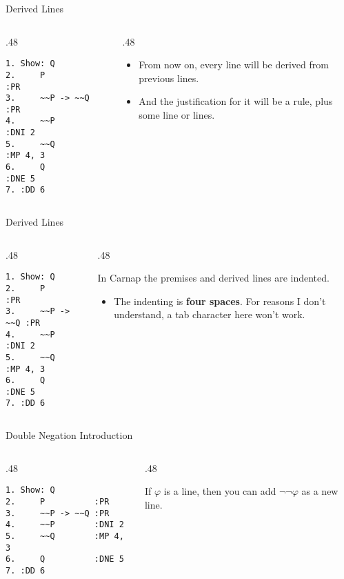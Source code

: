 \documentclass[
  ignorenonframetext,
]{beamer}
\providecommand{\tightlist}{%
  \setlength{\itemsep}{0pt}\setlength{\parskip}{0pt}}
\renewcommand{\,}{\text{, }}
\def\begincols{\begin{columns}}
\def\begincol{\begin{column}}
\def\endcol{\end{column}}
\def\endcols{\end{columns}}
\begin{document}
\begin{frame}[fragile]{Derived Lines}
\protect\hypertarget{derived-lines}{}

\begincols
\begincol{.48\textwidth}

\begin{verbatim}
1. Show: Q
2.     P          :PR
3.     ~~P -> ~~Q :PR
4.     ~~P        :DNI 2
5.     ~~Q        :MP 4, 3
6.     Q          :DNE 5
7. :DD 6
\end{verbatim}

\endcol
\begincol{.48\textwidth}

\begin{itemize}
\tightlist
\item
  From now on, every line will be derived from previous lines.
\item
  And the justification for it will be a rule, plus some line or lines.
\end{itemize}

\endcol
\endcols

\end{frame}

\begin{frame}[fragile]{Derived Lines}
\protect\hypertarget{derived-lines-1}{}

\begincols
\begincol{.48\textwidth}

\begin{verbatim}
1. Show: Q
2.     P          :PR
3.     ~~P -> ~~Q :PR
4.     ~~P        :DNI 2
5.     ~~Q        :MP 4, 3
6.     Q          :DNE 5
7. :DD 6
\end{verbatim}

\endcol
\begincol{.48\textwidth}

In Carnap the premises and derived lines are indented.

\begin{itemize}
\tightlist
\item
  The indenting is \textbf{four spaces}. For reasons I don't understand,
  a tab character here won't work.
\end{itemize}

\endcol
\endcols

\end{frame}

\begin{frame}[fragile]{Double Negation Introduction}
\protect\hypertarget{double-negation-introduction}{}

\begincols
\begincol{.48\textwidth}

\begin{verbatim}
1. Show: Q
2.     P          :PR
3.     ~~P -> ~~Q :PR
4.     ~~P        :DNI 2
5.     ~~Q        :MP 4, 3
6.     Q          :DNE 5
7. :DD 6
\end{verbatim}

\endcol
\begincol{.48\textwidth}

If \(\varphi\) is a line, then you can add \(\neg \neg \varphi\) as a
new line.

\endcol
\endcols

\end{frame}
\end{document}

